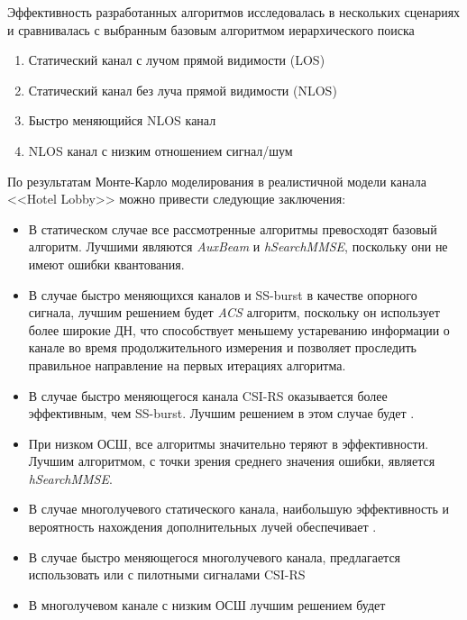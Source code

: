 Эффективность разработанных алгоритмов исследовалась в нескольких сценариях и сравнивалась 
с выбранным базовым алгоритмом иерархического поиска
\begin{enumerate}
    \item Статический канал с лучом прямой видимости (LOS)
    \item Статический канал без луча прямой видимости (NLOS)
    \item Быстро меняющийся NLOS канал 
    \item NLOS канал с низким отношением сигнал/шум 
\end{enumerate}
По результатам Монте-Карло моделирования в реалистичной модели канала
<<Hotel Lobby>> можно привести следующие заключения: 
\begin{itemize}
    \item В статическом случае все рассмотренные алгоритмы превосходят
    базовый алгоритм. Лучшими являются \textit{AuxBeam} и \textit{hSearchMMSE}, 
    поскольку они не имеют ошибки квантования. 
    \item В случае быстро меняющихся каналов и SS-burst в качестве опорного
    сигнала, лучшим решением будет \textit{ACS} алгоритм, поскольку он
    использует более широкие ДН, что способствует меньшему устареванию
    информации о канале во время продолжительного измерения и позволяет
    проследить правильное направление на первых итерациях алгоритма. 
    \item В случае быстро меняющегося канала CSI-RS оказывается более 
    эффективным, чем SS-burst. Лучшим решением в этом случае будет \AuxBeam.
    \item При низком ОСШ, все алгоритмы значительно теряют в эффективности. Лучшим 
    алгоритмом, с точки зрения среднего значения ошибки, является \textit{hSearchMMSE}.
    \item В случае многолучевого статического канала, наибольшую эффективность 
    и вероятность нахождения дополнительных лучей обеспечивает \hSearchMMSE.
    \item В случае быстро меняющегося многолучевого канала, предлагается использовать
    \AuxBeam или \hSearchMMSE с пилотными сигналами CSI-RS 
    \item В многолучевом канале с низким ОСШ лучшим решением будет \hSearchMMSE
\end{itemize}

